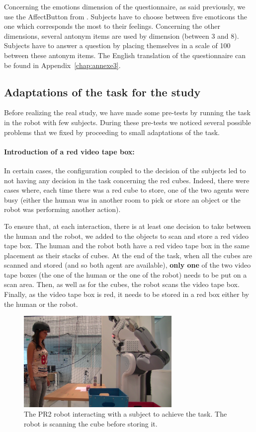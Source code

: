 \documentclass[english,a4paper,11pt,twoside]{StyleThese}
\begin{document}
Concerning the emotions dimension of the questionnaire, as said previously, we use the AffectButton from \cite{broekens2013affectbutton}. Subjects have to choose between five emoticons the one which corresponds the most to their feelings. Concerning the other dimensions, several antonym items are used by dimension (between 3 and 8). Subjects have to answer a question by placing themselves in a scale of 100 between these antonym items. The English translation of the questionnaire can be found in Appendix~\ref{chap:annexe3}.

\subsection{Adaptations of the task for the study}

Before realizing the real study, we have made some pre-tests by running the task in the robot with few subjects. During these pre-tests we noticed several possible problems that we fixed by proceeding to small adaptations of the task.

\paragraph{Introduction of a red video tape box:}
In certain cases, the configuration coupled to the decision of the subjects led to not having any decision in the task concerning the red cubes. Indeed, there were cases where, each time there was a red cube to store, one of the two agents were busy (either the human was in another room to pick or store an object or the robot was performing another action). 

To ensure that, at each interaction, there is at least one decision to take between the human and the robot, we added to the objects to scan and store a red video tape box. The human and the robot both have a red video tape box in the same placement as their stacks of cubes. At the end of the task, when all the cubes are scanned and stored (and so both agent are available), \textbf{only one} of the two video tape boxes (the one of the human or the one of the robot) needs to be put on a scan area. Then, as well as for the cubes, the robot scans the video tape box. Finally, as the video tape box is red, it needs to be stored in a red box either by the human or the robot.


\begin{figure}[!t]
	\centering
    \includegraphics[width=0.7\textwidth]{figs/Chapter5/Scan.png}
    \caption{The PR2 robot interacting with a subject to achieve the task. The robot is scanning the cube before storing it.}
    \label{fig:scan}
\end{figure}
\end{document}
